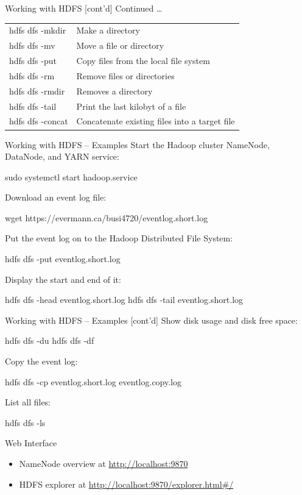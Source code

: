 \documentclass[ignorenonframetext,xcolor=x11names]{beamer}
\begin{document}
\begin{frame}[label=withcode]{Working with HDFS \small [cont'd]}
Continued \ldots \\

\renewcommand{\arraystretch}{1.25}
\begin{tabular}{l|l} \hline
hdfs dfs -mkdir & Make a directory \\
hdfs dfs -mv & Move a file or directory \\
hdfs dfs -put & Copy files from the local file system \\
hdfs dfs -rm & Remove files or directories \\
hdfs dfs -rmdir & Removes a directory \\
hdfs dfs -tail & Print the last kilobyt of a file \\
hdfs dfs -concat & Concatenate existing files into a target file \\ \hline
\end{tabular}
\end{frame}


\begin{frame}[label=withcode,fragile]{Working with HDFS -- Examples}
Start the Hadoop cluster NameNode, DataNode, and YARN service:
\begin{bashcode}
sudo systemctl start hadoop.service
\end{bashcode}
Download an event log file:
\begin{bashcode}
wget https://evermann.ca/busi4720/eventlog.short.log
\end{bashcode}
Put the event log on to the Hadoop Distributed File System:
\begin{bashcode}
hdfs dfs -put eventlog.short.log
\end{bashcode}
Display the start and end of it:
\begin{bashcode}
hdfs dfs -head eventlog.short.log
hdfs dfs -tail eventlog.short.log
\end{bashcode}
\end{frame}

\begin{frame}[label=withcode,fragile]{Working with HDFS -- Examples \small [cont'd]}
Show disk usage and disk free space:
\begin{bashcode}
hdfs dfs -du
hdfs dfs -df
\end{bashcode}
Copy the event log:
\begin{bashcode}
hdfs dfs -cp eventlog.short.log eventlog.copy.log
\end{bashcode}
List all files:
\begin{bashcode}
hdfs dfs -ls
\end{bashcode}
\begin{block}{Web Interface}
\begin{itemize}
\item NameNode overview at \url{http://localhost:9870}
\item HDFS explorer at \url{http://localhost:9870/explorer.html#/}
\end{itemize}
\end{block}
\end{frame}
\end{document}
